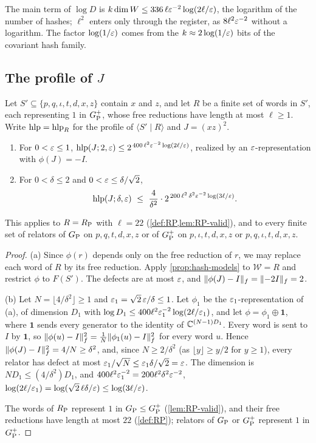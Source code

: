 The main term of $\log D$ is $k\dim W\le336\,\ell\varepsilon^{-2}\log(2\ell/\varepsilon)$, the logarithm of the number of hashes; $\ell^2$ enters only
through the register, as $8\ell^2\varepsilon^{-2}$ without a logarithm. The factor $\log(1/\varepsilon)$ comes from the $k\approx2\log(1/\varepsilon)$ bits of
the covariant hash family.

\subsection{The profile of \texorpdfstring{$J$}{J}}

\begin{theorem}\label{thm:upper}
Let $S'\subseteq\{p,q,\iota,t,d,x,z\}$ contain $x$ and $z$, and let $R$ be a finite set of words in $S'$, each representing $1$ in $G_{\mathrm P}^{+}$,
whose free reductions have length at most $\ell\ge1$. Write $\operatorname{hlp}=\operatorname{hlp}_R$ for the profile of $\langle S'\mid R\rangle$ and $J=(xz)^2$.
\begin{enumerate}[label=(\alph*),itemsep=1pt]
\item For $0<\varepsilon\le1$, $\operatorname{hlp}(J;2,\varepsilon)\le2^{\,400\,\ell^2\varepsilon^{-2}\log(2\ell/\varepsilon)}$, realized by an $\varepsilon$-representation with
$\phi(J)=-I$.
\item For $0<\delta\le2$ and $0<\varepsilon\le\delta/\sqrt2$,
\[
\hlp(J;\delta,\eps)\ \le\ \frac4{\delta^2}\cdot2^{\,200\,\ell^2\,\delta^2\eps^{-2}\log(3\ell/\eps)} .
\]
\end{enumerate}
This applies to $R=R_{\mathrm P}$ with $\ell=22$ (\cref{def:RP,lem:RP-valid}), and to every finite set of relators of $G_{\mathrm P}$ on $p,q,t,d,x,z$ or of
$G_{\mathrm P}^{+}$ on $p,\iota,t,d,x,z$ or $p,q,\iota,t,d,x,z$.
\end{theorem}

\begin{proof}
(a) Since $\phi(r)$ depends only on the free reduction of $r$, we may replace each word of $R$ by its free reduction. Apply
\cref{prop:hash-models} to $\mathcal W=R$ and restrict $\phi$ to $F(S')$. The defects are at most $\varepsilon$, and
$\lVert \phi(J)-I\rVert_f=\lVert -2I\rVert_f=2$.

(b) Let $N=\lfloor4/\delta^2\rfloor\ge1$ and $\varepsilon_1=\sqrt2\,\varepsilon/\delta\le1$. Let $\phi_1$ be the $\varepsilon_1$-representation of (a), of
dimension $D_1$ with $\log D_1\le400\ell^2\varepsilon_1^{-2}\log(2\ell/\varepsilon_1)$, and let $\phi=\phi_1\oplus\mathbf 1$, where $\mathbf 1$ sends every
generator to the identity of $\mathbb C^{(N-1)D_1}$. Every word is sent to $I$ by $\mathbf 1$, so $\lVert \phi(u)-I\rVert_f^2=\frac1N\lVert \phi_1(u)-I\rVert_f^2$ for
every word $u$. Hence $\lVert \phi(J)-I\rVert_f^2=4/N\ge\delta^2$, and, since $N\ge2/\delta^2$ (as $\lfloor y\rfloor\ge y/2$ for $y\ge1$), every
relator has defect at most $\varepsilon_1/\sqrt N\le\varepsilon_1\delta/\sqrt2=\varepsilon$. The dimension is $ND_1\le(4/\delta^2)D_1$, and
$400\ell^2\varepsilon_1^{-2}=200\ell^2\delta^2\varepsilon^{-2}$, $\log(2\ell/\varepsilon_1)=\log(\sqrt2\,\ell\delta/\varepsilon)\le\log(3\ell/\varepsilon)$.

The words of $R_{\mathrm P}$ represent $1$ in $G_{\mathrm P}\le G_{\mathrm P}^{+}$ (\cref{lem:RP-valid}), and their free reductions have length at most $22$
(\cref{def:RP}); relators of $G_{\mathrm P}$ or $G_{\mathrm P}^{+}$ represent $1$ in $G_{\mathrm P}^{+}$.
\end{proof}

